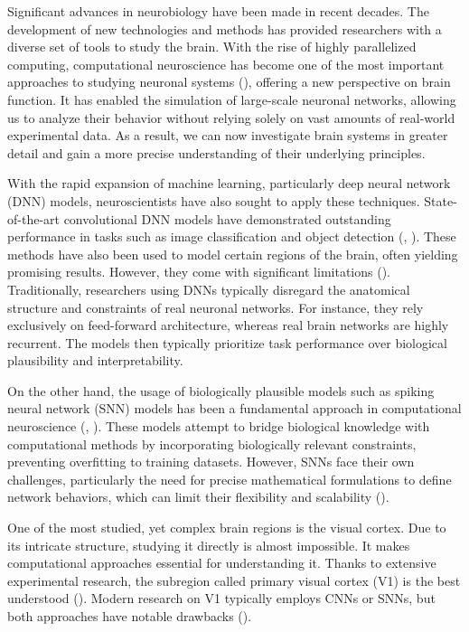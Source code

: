 

Significant advances in neurobiology have been made in recent decades. 
The development of new technologies and
methods has provided researchers with a diverse set of tools to
study the brain. With the rise of highly parallelized computing, 
computational neuroscience has become one of the most important
approaches to studying neuronal systems (\citet{trappenberg2009fundamentals}), 
offering a new perspective on
brain function. It has enabled the simulation of large-scale neuronal
networks, allowing us to analyze their behavior without relying solely
on vast amounts of real-world experimental data. As a result, we can
now investigate brain systems in greater detail and gain a more precise
understanding of their underlying principles.

With the rapid expansion of machine learning, particularly deep neural
network (DNN) models, neuroscientists have also sought to apply these techniques.
State-of-the-art convolutional DNN models have demonstrated outstanding
performance in tasks such as image classification and object detection
(\citet{krizhevsky2012imagenet}, \citet{li2014medical}). 
These methods have also been used to model certain regions of the brain, often
yielding promising results. However, they come
with significant limitations (\citet{celeghin2023convolutional}).
Traditionally, researchers using DNNs typically disregard the anatomical structure
and constraints of real neuronal networks. For instance, they rely exclusively on 
feed-forward architecture, whereas real brain networks are highly recurrent.
The models then typically prioritize task performance over biological plausibility
and interpretability.

On the other hand, the usage of biologically plausible models such as
spiking neural network (SNN) models has been a fundamental approach in computational
neuroscience (\citet{ghosh2009spiking}, \citet{yamazaki2022spiking}). 
These models attempt to bridge biological knowledge with computational
methods by incorporating biologically relevant constraints, preventing overfitting to
training datasets. However, SNNs face their own challenges, particularly the need for precise mathematical formulations to define network behaviors, which can
limit their flexibility and scalability (\citet{izhikevich2004model}).

One of the most studied, yet complex brain regions is the visual cortex.
Due to its intricate structure, studying it directly is almost impossible.
It makes computational approaches essential for understanding it. 
Thanks to extensive experimental research, the subregion called primary visual
cortex (V1) is the best understood (\citet{miikkulainen2006computational}). 
Modern research on V1 typically employs CNNs or SNNs, but both approaches
have notable drawbacks (\citet{niell2021cortical}).

